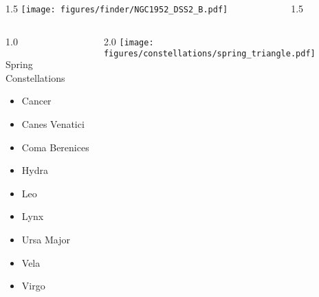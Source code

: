 \documentclass[final]{beamer}
\newlength{\colwidth}
\begin{document}

\begin{frame}[t]{}
  \begin{columns}[T]
    \begin{column}{1.5\colwidth}
      \centering
      \texttt{[image: figures/finder/NGC1952\_DSS2\_B.pdf]}
    \end{column}
    \begin{column}{1.5\colwidth}
      \Large
      
    \end{column}
  \end{columns}
\end{frame}


\begin{frame}[t]{}
  \begin{columns}[T]
    \begin{column}{1.0\colwidth}
      \Large
      \begin{block}{Spring Constellations}
        \begin{itemize}
          \item{Cancer}
          \item{Canes Venatici}
          \item{Coma Berenices}
          \item{Hydra}
          \item{Leo}
          \item{Lynx}
          \item{Ursa Major}
          \item{Vela}
          \item{Virgo}
        \end{itemize}
      \end{block}
    \end{column}
    \begin{column}{2.0\colwidth}
      \centering
      \texttt{[image: figures/constellations/spring\_triangle.pdf]}
    \end{column}
  \end{columns}
\end{frame}

\end{document}
